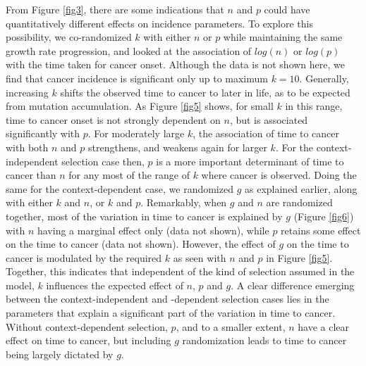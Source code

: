 \documentclass[9pt,twocolumn,twoside]{pnas-new}
\begin{document}
From Figure \ref{fig3}, there are some indications that $n$ and $p$ could have quantitatively different effects on incidence parameters. To explore this possibility, we co-randomized $k$ with either $n$ or $p$ while maintaining the same growth rate progression, and looked at the association of $log(n)$ or $log(p)$ with the time taken for cancer onset. Although the data is not shown here, we find that cancer incidence is significant only up to maximum $k=10$. Generally, increasing $k$ shifts the observed time to cancer to later in life, as to be expected from mutation accumulation. As Figure \ref{fig5} shows, for small $k$ in this range, time to cancer onset is not strongly dependent on $n$, but is associated significantly with $p$. For moderately large $k$, the association of time to cancer with both $n$ and $p$ strengthens, and weakens again for larger $k$. For the context-independent selection case then, $p$ is a more important determinant of time to cancer than $n$ for any most of the range of $k$ where cancer is observed.
Doing the same for the context-dependent case, we randomized $g$ as explained earlier, along with either $k$ and $n$, or $k$ and $p$. Remarkably, when $g$ and $n$ are randomized together, most of the variation in time to cancer is explained by $g$ (Figure \ref{fig6}) with $n$ having a marginal effect only (data not shown), while $p$ retains some effect on the time to cancer (data not shown). However, the effect of $g$ on the time to cancer is modulated by the required $k$ as seen with $n$ and $p$ in Figure \ref{fig5}. Together, this indicates that independent of the kind of selection assumed in the model, $k$ influences the expected effect of $n$, $p$ and $g$. A clear difference emerging between the context-independent and -dependent selection cases lies in the parameters that explain a significant part of the variation in time to cancer. Without context-dependent selection, $p$, and to a smaller extent, $n$ have a clear effect on time to cancer, but including $g$ randomization leads to time to cancer being largely dictated by $g$.
\end{document}

